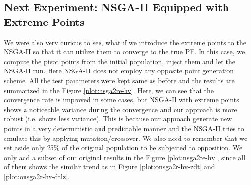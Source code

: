 \documentclass[journal]{IEEEtran}
\begin{document}
\subsection{Next Experiment: NSGA-II Equipped with Extreme Points}
\label{subsec:nsga2re}
We were also very curious to see, what if we introduce the extreme points to the NSGA-II so that it can utilize them to converge to the true PF. In this case, we compute the pivot points from the initial population, inject them and let the NSGA-II run. Here NSGA-II does not employ any opposite point generation scheme. All the test parameters were kept same as before and the results are summarized in the Figure \ref{plot:nsga2re-hv}. Here, we can see that the convergence rate is improved in some cases, but NSGA-II with extreme points shows a noticeable variance during the convergence and our approach is more robust (i.e. shows less variance). This is because our approach generate new points in a very deterministic and predictable manner and the NSGA-II tries to emulate this by applying mutation/crossover. We also need to remember that we set aside only 25\% of the original population to be subjected to opposition. We only add a subset of our original results in the Figure \ref{plot:nsga2re-hv}, since all of them shows the similar trend as in Figure \ref{plot:onsga2r-hv-zdt} and \ref{plot:onsga2r-hv-dtlz}.
\end{document}
